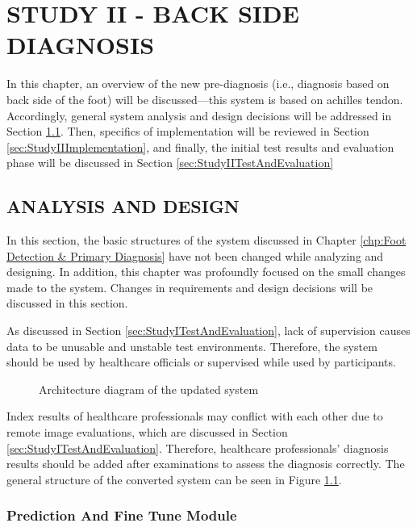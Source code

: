 \chapter{STUDY II - BACK SIDE DIAGNOSIS}\label{chp:Back Side Diagnosis}

In this chapter, an overview of the new pre-diagnosis (i.e., diagnosis based on back side of the foot) will be discussed—this system is based on achilles tendon. Accordingly, general system analysis and design decisions will be addressed in Section \ref{sec:StudyIIAnalysisAndDesign}. Then, specifics of implementation will be reviewed in Section \ref{sec:StudyIIImplementation}, and finally, the initial test results and evaluation phase will be discussed in Section \ref{sec:StudyIITestAndEvaluation}

\section{ANALYSIS AND DESIGN} \label{sec:StudyIIAnalysisAndDesign}

In this section, the basic structures of the system discussed in Chapter \ref{chp:Foot Detection & Primary Diagnosis} have not been changed while analyzing and designing. In addition, this chapter was profoundly focused on the small changes made to the system. Changes in requirements and design decisions will be discussed in this section.

As discussed in Section \ref{sec:StudyITestAndEvaluation}, lack of supervision causes data to be unusable and unstable test environments. Therefore, the system should be used by healthcare officials or supervised while used by participants.

\begin{figure}[htbp]
\centering
{}
\caption{Architecture diagram of the updated system}
\label{fig:GeneralArchitectureDiagramPartI}
\end{figure}

Index results of healthcare professionals may conflict with each other due to remote image evaluations, which are discussed in Section \ref{sec:StudyITestAndEvaluation}. Therefore, healthcare professionals’ diagnosis results should be added after examinations to assess the diagnosis correctly. The general structure of the converted system can be seen in Figure \ref{fig:GeneralArchitectureDiagramPartI}.

\subsection{ Prediction And Fine Tune Module }

